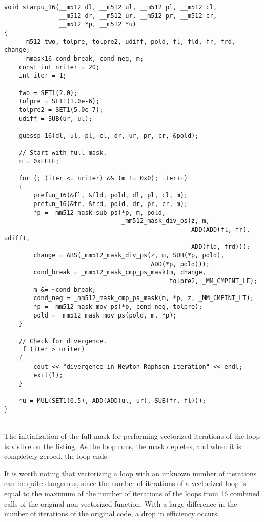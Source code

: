 \documentclass[
11pt,%
tightenlines,%
twoside,%
onecolumn,%
nofloats,%
nobibnotes,%
nofootinbib,%
superscriptaddress,%
noshowpacs,%
centertags]%
{revtex4}
\begin{document}
\begin{lstlisting}[caption={Vectorized version of \texttt{starpu}.},label={lst:prac_riemann_starpu_vec}]
void starpu_16(__m512 dl, __m512 ul, __m512 pl, __m512 cl,
               __m512 dr, __m512 ur, __m512 pr, __m512 cr,
               __m512 *p, __m512 *u)
{
    __m512 two, tolpre, tolpre2, udiff, pold, fl, fld, fr, frd, change;
    __mmask16 cond_break, cond_neg, m;
    const int nriter = 20;
    int iter = 1;

    two = SET1(2.0);
    tolpre = SET1(1.0e-6);
    tolpre2 = SET1(5.0e-7);
    udiff = SUB(ur, ul);

    guessp_16(dl, ul, pl, cl, dr, ur, pr, cr, &pold);

    // Start with full mask.
    m = 0xFFFF;

    for (; (iter <= nriter) && (m != 0x0); iter++)
    {
        prefun_16(&fl, &fld, pold, dl, pl, cl, m);
        prefun_16(&fr, &frd, pold, dr, pr, cr, m);
        *p = _mm512_mask_sub_ps(*p, m, pold,
                                _mm512_mask_div_ps(z, m,
                                                   ADD(ADD(fl, fr), udiff),
                                                   ADD(fld, frd)));
        change = ABS(_mm512_mask_div_ps(z, m, SUB(*p, pold),
                                        ADD(*p, pold)));
        cond_break = _mm512_mask_cmp_ps_mask(m, change,
                                             tolpre2, _MM_CMPINT_LE);
        m &= ~cond_break;
        cond_neg = _mm512_mask_cmp_ps_mask(m, *p, z, _MM_CMPINT_LT);
        *p = _mm512_mask_mov_ps(*p, cond_neg, tolpre);
        pold = _mm512_mask_mov_ps(pold, m, *p);
    }

    // Check for divergence.
    if (iter > nriter)
    {
        cout << "divergence in Newton-Raphson iteration" << endl;
        exit(1);
    }

    *u = MUL(SET1(0.5), ADD(ADD(ul, ur), SUB(fr, fl)));
}
\end{lstlisting}

\ \\

The initialization of the full mask for performing vectorized iterations of the loop is visible on the listing.
As the loop runs, the mask depletes, and when it is completely zeroed, the loop ends.

It is worth noting that vectorizing a loop with an unknown number of iterations can be quite dangerous, since the number of iterations of a vectorized loop is equal to the maximum of the number of iterations of the loops from 16 combined calls of the original non-vectorized function.
With a large difference in the number of iterations of the original code, a drop in efficiency occurs.
\end{document}
